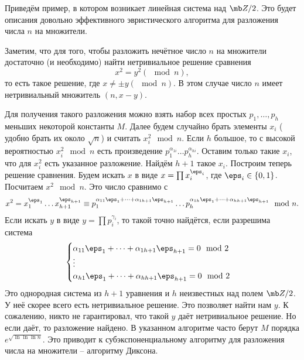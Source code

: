 Приведём пример, в котором возникает линейная система над $\mb Z/2$. Это будет описания довольно эффективного эвристического алгоритма для разложения числа $n$ на множители. 

Заметим, что для того, чтобы разложить нечётное число $n$ на множители достаточно (и необходимо) найти нетривиальное решение сравнения $$x^2=y^2(\mod n),$$
то есть такое решение, где $x\neq \pm y (\mod n)$. В этом случае число $n$ имеет нетривиальный множитель $(n,x-y)$.

Для получения такого разложения можно взять набор всех простых $p_1,\dots,p_h$ меньших некоторой константы $M$. Далее будем случайно брать элементы $x_i$ ( удобно брать их около $\sqrt{n}$) и считать  $x_i^2 \mod n$. Если $h$ большое, то с высокой вероятностью $x_i^2\mod  n$ есть произведение $p_1^{\alpha_{1i}}\dots p_h^{\alpha_{hi}}$. Оставим только такие $x_i$, что для $x_i^2$ есть указанное разложение. Найдём $h+1$ такое $x_i$. Построим теперь решение сравнения. Будем искать $x$ в виде $x=\prod x_i^{\eps_i}$, где $\eps_i \in \{0,1\}$. Посчитаем $x^2 \mod n$. Это число сравнимо с 
$$x^2 =x_1^{\eps_1}\dots x_{h+1}^{\eps_{h+1}} \equiv p_1^{\alpha_{11}\eps_1 +\dots+\alpha_{1h+1}\eps_{h+1}} \dots p_h^{\alpha_{1h}\eps_1 +\dots+\alpha_{h h+1}\eps_{h+1}} \mod n.$$
Если искать $y$ в виде $y=\prod p_i^{\gamma_i}$, то такой точно найдётся, если разрешима система
$$\begin{cases}
\alpha_{11} \eps_1+\dots+\alpha_{1h+1}\eps_{h+1}=0 \mod 2 \\
\vdots\\
\alpha_{h1} \eps_1+\dots+\alpha_{hh+1}\eps_{h+1}=0 \mod 2
\end{cases}$$
Это однородная система из $h+1$ уравнения и $h$ неизвестных над полем $\mb Z/2$. У неё скорее всего есть нетривиальное решение. Это позволяет найти нам $y$. К сожалению, никто не гарантировал, что такой $y$ даёт нетривиальное решение. Но если даёт, то разложение найдено. В указанном алгоритме часто берут $M$ порядка $e^{\sqrt{\ln \ln\ln n}}$. Это приводит к субэкспоненциальному алгоритму для разложения числа на множители -- алгоритму Диксона.

